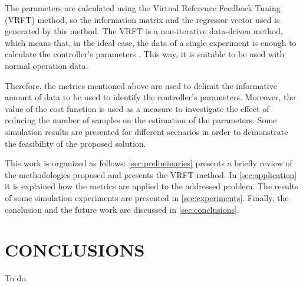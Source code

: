 \documentclass[letterpaper, 10 pt, conference]{ieeeconf}  %
\begin{document}
The parameters are calculated using the Virtual Reference Feedback Tuning (VRFT) method, so the information matrix and the regressor vector used is generated by this method.
The VRFT is a non-iterative data-driven method, which means that, in the ideal case, the data of a single experiment is enough to calculate the controller's parameters \cite{bazanella2011data}.
This way, it is suitable to be used with normal operation data.

Therefore, the metrics mentioned above are used to delimit the informative amount of data to be used to identify the controller's parameters.
Moreover, the value of the cost function is used as a measure to investigate the effect of reducing the number of samples on the estimation of the parameters.
Some simulation results are presented for different scenarios in order to demonstrate the feasibility of the proposed solution.

This work is organized as follows: \autoref{sec:preliminaries} presents a briefly review of the methodologies proposed and presents the VRFT method.
In \autoref{sec:application} it is explained how the metrics are applied to the addressed problem.
The results of some simulation experiments are presented in \autoref{sec:experiments}.
Finally, the conclusion and the future work are discussed in \autoref{sec:conclusions}.








\section{\label{sec:conclusions} CONCLUSIONS}

To do.

\addtolength{\textheight}{-12cm}   %






%





\end{document}
